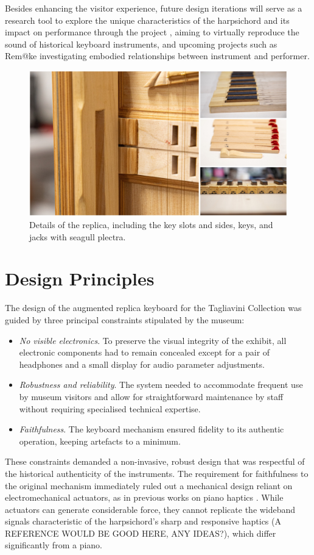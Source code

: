 Besides enhancing the visitor experience, future design iterations will serve as a research tool to explore the unique characteristics of the harpsichord and its impact on performance through the  project \cite{NEMUS}, aiming to virtually reproduce the sound of historical keyboard instruments, and upcoming projects such as Rem@ke \cite{remake1} investigating embodied relationships between instrument and performer.

\begin{figure}
\centering
\includegraphics[width=0.8\linewidth]{src/images/details.jpg}
\caption{Details of the replica, including the key slots and sides, keys, and jacks with seagull plectra.}\label{fig:details}
\end{figure}

\section{Design Principles}\label{design}

The design of the augmented replica keyboard for the Tagliavini Collection was guided by three principal constraints stipulated by the museum:
\begin{itemize}
\item \emph{No visible electronics}. To preserve the visual integrity of the exhibit, all electronic components had to remain concealed except for a pair of headphones and a small display for audio parameter adjustments.
\item \emph{Robustness and reliability}. The system needed to accommodate frequent use by museum visitors and allow for straightforward maintenance by staff without requiring specialised technical expertise.
\item \emph{Faithfulness}. The keyboard mechanism ensured fidelity to its authentic operation, keeping artefacts to a minimum. 
\end{itemize}
These constraints demanded a non-invasive, robust design that was respectful of the historical authenticity of the instruments. The requirement for faithfulness to the original mechanism immediately ruled out a mechanical design reliant on electromechanical actuators, as in previous works on piano haptics \cite{Timmermans2020,Gillespie1996}. While actuators can generate considerable force, they cannot replicate the wideband signals characteristic of the harpsichord's sharp and responsive haptics (A REFERENCE WOULD BE GOOD HERE, ANY IDEAS?), which differ significantly from a piano.




